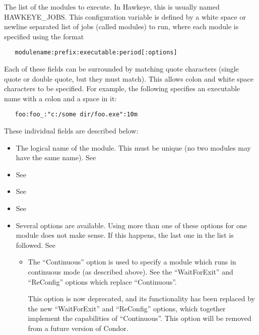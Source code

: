 \begin{description}

\label{param:StartdCronJobs}
\item[\Macro{STARTD\_CRON\_JOBS}]
  The list of the modules to execute.  In Hawkeye, this is usually
  named HAWKEYE\_JOBS.
  This configuration variable is defined by
  a white space or newline separated list of jobs (called modules) to run,
  where each module is specified using the format
\begin{verbatim}
   modulename:prefix:executable:period[:options]
\end{verbatim}
  Each of these fields can be surrounded by matching quote characters
  (single quote or double quote, but they must match).  This allows
  colon and white space characters to be specified.  For example, the
  following specifies an executable name with a colon and a space in it:
\begin{verbatim}
   foo:foo_:"c:/some dir/foo.exe":10m
\end{verbatim}
  These individual fields are described below: 
    \begin{itemize}

    \item {} The logical name of the module.  This 
    must be unique (no two modules may have the same name).  See 

    \item {}
    See 

    \item {}
    See 

    \item {}
    See 

   \item Several options are available. Using more than one
   of these options for one module does not make sense.  If this happens,
   the last one in the list is followed. 
   See 

	\begin{itemize}
	\item The ``Continuous'' option is used to specify a module
	which runs in continuous mode (as described above).  See the
	``WaitForExit'' and ``ReConfig'' options which replace
	``Continuous''.

	This option is now deprecated, and its functionality has been
	replaced by the new ``WaitForExit'' and ``ReConfig'' options,
	which together implement the capabilities of ``Continuous''.
	This option will be removed from a future version of Condor.


\end{itemize}
\end{itemize}
\end{description}
